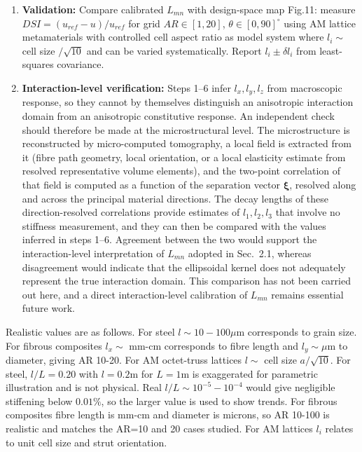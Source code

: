 \documentclass[final,3p,times,fleqn]{elsarticle}
\begin{document}
\begin{enumerate}
  \item \textbf{Validation:} Compare calibrated $L_{mn}$ with design-space map Fig.11: measure $DSI=(u_{ref}-u)/u_{ref}$ for grid $AR\in[1,20]$, $\theta\in[0,90]^\circ$ using AM lattice metamaterials with controlled cell aspect ratio as model system where $l_i\sim$ cell size $/\sqrt{10}$ and can be varied systematically. Report $l_i\pm \delta l_i$ from least-squares covariance.

  \item \textbf{Interaction-level verification:} Steps 1--6 infer
  $l_{x},l_{y},l_{z}$ from macroscopic response, so they cannot by
  themselves distinguish an anisotropic interaction domain from an
  anisotropic constitutive response. An independent check should
  therefore be made at the microstructural level. The microstructure is
  reconstructed by micro-computed tomography, a local field is extracted
  from it (fibre path geometry, local orientation, or a local elasticity
  estimate from resolved representative volume elements), and the
  two-point correlation of that field is computed as a function of the
  separation vector $\boldsymbol{\xi}$, resolved along and across the
  principal material directions. The decay lengths of these
  direction-resolved correlations provide estimates of $l_{1},l_{2},l_{3}$
  that involve no stiffness measurement, and they can then be compared
  with the values inferred in steps 1--6. Agreement between the two would
  support the interaction-level interpretation of $L_{mn}$ adopted in
  Sec.~2.1, whereas disagreement would
  indicate that the ellipsoidal kernel does not adequately represent the
  true interaction domain. This comparison has not been carried out here,
  and a direct interaction-level calibration of $L_{mn}$ remains essential
  future work.
\end{enumerate}

Realistic values are as follows. For steel $l\sim10-100\mu$m corresponds to grain size. For fibrous composites $l_x\sim$ mm-cm corresponds to fibre length and $l_y\sim\mu$m to diameter, giving AR 10-20. For AM octet-truss lattices $l\sim$ cell size $a/\sqrt{10}$. For steel, $l/L=0.20$ with $l=0.2$m for $L=1$m is exaggerated for parametric illustration and is not physical. Real $l/L\sim10^{-5}-10^{-4}$ would give negligible stiffening below $0.01\%$, so the larger value is used to show trends. For fibrous composites fibre length is mm-cm and diameter is microns, so AR 10-100 is realistic and matches the AR=10 and 20 cases studied. For AM lattices $l_i$ relates to unit cell size and strut orientation.
\end{document}
